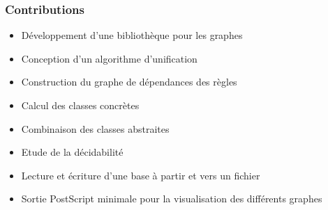 \begin{frame}
	\frametitle{Contributions}
	\begin{itemize}
		\item Développement d'une bibliothèque pour les graphes
		\item Conception d'un algorithme d'unification
		\item Construction du graphe de dépendances des règles
		\item Calcul des classes concrètes
		\item Combinaison des classes abstraites
		\item Etude de la décidabilité
		\item Lecture et écriture d'une base à partir et vers un fichier
		\item Sortie PostScript minimale pour la visualisation des différents graphes
	\end{itemize}
\end{frame}


